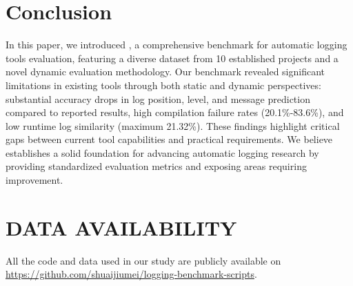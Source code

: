 \section{Conclusion}
\label{sec: conclusion}

In this paper, we introduced \methodname, a comprehensive benchmark for automatic logging tools evaluation, featuring a diverse dataset from 10 established projects and a novel dynamic evaluation methodology. Our benchmark revealed significant limitations in existing tools through both static and dynamic perspectives: substantial accuracy drops in log position, level, and message prediction compared to reported results, high compilation failure rates (20.1\%-83.6\%), and low runtime log similarity (maximum 21.32\%). These findings highlight critical gaps between current tool capabilities and practical requirements. We believe \methodname establishes a solid foundation for advancing automatic logging research by providing standardized evaluation metrics and exposing areas requiring improvement.

\section{DATA AVAILABILITY}
All the code and data used in our study are publicly available on \url{https://github.com/shuaijiumei/logging-benchmark-scripts}.